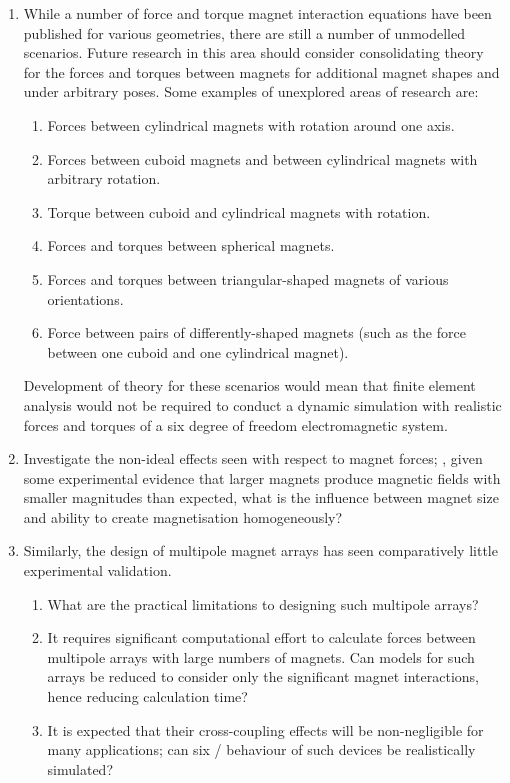 \documentclass[11pt,a4paper]{memoir}
\begin{document}
\begin{enumerate}\itemsep=\medskipamount
\item
While a number of force and torque magnet interaction equations have been published for various geometries, there are still a number of unmodelled scenarios.
Future research in this area should consider consolidating theory for the forces and torques between magnets for additional magnet shapes and under arbitrary poses.
Some examples of unexplored areas of research are:
\begin{enumerate}
\item Forces between cylindrical magnets with rotation around one axis.
\item Forces between cuboid magnets and between cylindrical magnets with arbitrary rotation.
\item Torque between cuboid and cylindrical magnets with rotation.
\item Forces and torques between spherical magnets.
\item Forces and torques between triangular-shaped magnets of various orientations.
\item Force between pairs of differently-shaped magnets (such as the force between one cuboid and one cylindrical magnet).
\end{enumerate}
Development of theory for these scenarios would mean that finite element analysis would not be required to conduct a dynamic simulation with realistic forces and torques of a six degree of freedom electromagnetic system.

\item
Investigate the non-ideal effects seen with respect to magnet forces; \eg, given some experimental evidence that larger magnets produce magnetic fields with smaller magnitudes than expected, what is the influence between magnet size and ability to create magnetisation homogeneously?

\item
Similarly, the design of multipole magnet arrays has seen comparatively little experimental validation.
\begin{enumerate}
\item
What are the practical limitations to designing such multipole arrays?
\item
It requires significant computational effort to calculate forces between multipole arrays with large numbers of magnets. Can models for such arrays be reduced to consider only the significant magnet interactions, hence reducing calculation time?
\item
It is expected that their cross-coupling effects will be non-negligible for many applications; can six \dof/ behaviour of such devices be realistically simulated?
\end{enumerate}

\end{enumerate}
\end{document}
